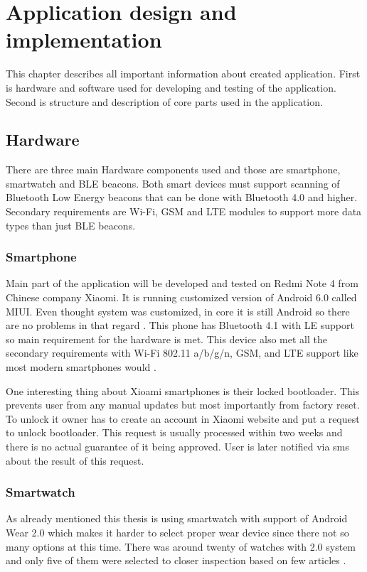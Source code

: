 \chapter{Application design and implementation}\label{sec:ApplicationDesingAndImplementation}
This chapter describes all important information about created application. First is hardware and software used for developing and testing of the application. Second is structure and description of core parts used in the application. 

\section{Hardware}\label{sec:Hardware}
There are three main Hardware components used and those are smartphone, smartwatch and BLE beacons. Both smart devices must support scanning of Bluetooth Low Energy beacons that can be done with Bluetooth 4.0 and higher. Secondary requirements are Wi-Fi, GSM and LTE modules to support more data types than just BLE beacons.


\subsection{Smartphone}\label{subsec:Smartphone}
Main part of the application will be developed and tested on Redmi Note 4 from Chinese company Xiaomi. It is running customized version of Android 6.0 called MIUI. Even thought system was customized, in core it is still Android so there are no problems in that regard \cite{XRN4LTE}. This phone has Bluetooth 4.1 with LE support so main requirement for the hardware is met. This device also met all the secondary requirements with Wi-Fi 802.11 a/b/g/n, GSM, and LTE support like most modern smartphones would \cite{XRN4FPS}.

One interesting thing about Xioami smartphones is their locked bootloader. This prevents user from any manual updates but most importantly from factory reset. To unlock it owner has to create an account in Xiaomi website and put a request to unlock bootloader. This request is usually processed within two weeks and there is no actual guarantee of it being approved. User is later notified via sms about the result of this request.

\subsection{Smartwatch}\label{subsec:Smartwatch}
As already mentioned this thesis is using smartwatch with support of Android Wear 2.0 which makes it harder to select proper wear device since there not so many options at this time. There was around twenty of watches with 2.0 system and only five of them were selected to closer inspection based on few articles \cite{BAWW, BAWW18, BAWW17}.

